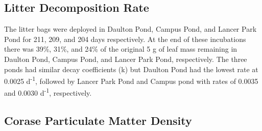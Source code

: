 \subsection{Litter Decomposition Rate}

 The litter bags were deployed in Daulton Pond, Campus Pond, and Lancer Park Pond for 211, 209, and 204 days respectively. At the end of these incubations there was 39\%, 31\%, and 24\% of the original 5 g of leaf mass remaining in Daulton Pond, Campus Pond, and Lancer Park Pond, respectively. The three ponds had similar decay coefficients (k) but Daulton Pond had the lowest rate at 0.0025 d\textsuperscript{-1}, followed by Lancer Park Pond and Campus pond with rates of 0.0035 and 0.0030 d\textsuperscript{-1}, respectively.  

\subsection{Corase Particulate Matter Density}


